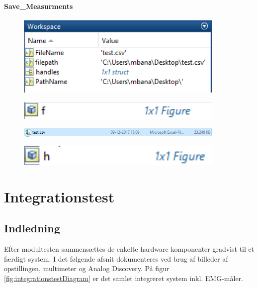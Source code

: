 \subsubsection{Save\_Measurments} 


\begin{figure}[H] 
\centering
{\includegraphics[width=10cm]
{Figure/modultestsave1}}
\caption{}
\label{fig:modultestsave1}
\end{figure}

\begin{figure}[H] 
\centering
{\includegraphics[width=10cm]
{Figure/modultestsave2}}
\caption{}
\label{fig:modultestsave1}
\end{figure}

\begin{figure}[H] 
\centering
{\includegraphics[width=10cm]
{Figure/modultestsave3}}
\caption{}
\label{fig:modultestsave1}
\end{figure}

\begin{figure}[H] 
\centering
{\includegraphics[width=10cm]
{Figure/modultestsave4}}
\caption{}
\label{fig:modultestsave1}
\end{figure}


\chapter{Integrationstest}

\section{Indledning}


Efter modultesten sammensættes de enkelte hardware komponenter gradvist til et færdigt system. I det følgende afsnit dokumenteres ved brug af billeder af opstillingen, multimeter og Analog Discovery. På figur \ref{fig:integrationstestDiagram} er det samlet integreret system inkl. EMG-måler.

